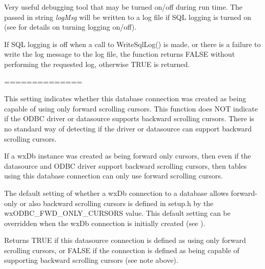 \label{wxdbwritesqllog}





Very useful debugging tool that may be turned on/off during run time.  The
passed in string {\it logMsg} will be written to a log file if SQL logging
is turned on (see  for details on turning logging on/off).


If SQL logging is off when a call to WriteSqlLog() is made, or there is a
failure to write the log message to the log file, the function returns
FALSE without performing the requested log, otherwise TRUE is returned.



==============
\label{wxdbisfwdonlycursors}



This setting indicates whether this database connection was created
as being capable of using only forward scrolling cursors.  This function
does NOT indicate if the ODBC driver or datasource supports backward
scrolling cursors.  There is no standard way of detecting if the driver
or datasource can support backward scrolling cursors.

If a wxDb instance was created as being forward only cursors, then even if
the datasource and ODBC driver support backward scrolling cursors, then
tables using this database connection can only use forward scrolling
cursors.

The default setting of whether a wxDb connection to a database allows
forward-only or also backward scrolling cursors is defined in setup.h by 
the wxODBC_FWD_ONLY_CURSORS value.  This default setting can be overridden
when the wxDb connection is initially created (see ).


Returns TRUE if this datasource connection is defined as using only forward
scrolling cursors, or FALSE if the connection is defined as being capable
of supporting backward scrolling cursors (see note above).

